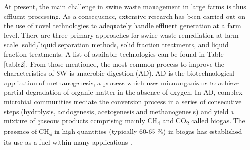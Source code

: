 At present, the main challenge in swine waste management in large farms is thus effluent processing. As a consequence, extensive research has been carried out on the use of novel technologies to adequately handle effluent generation at a farm level. There are three primary approaches for swine waste remediation at farm scale: solid/liquid separation methods, solid fraction treatments, and liquid fraction treatments. A list of available technologies can be found in Table \ref{table2}. From those mentioned, the most common process to improve the characteristics of SW is anaerobic digestion (AD). AD is the biotechnological application of methanogenesis, a process which uses microorganisms to achieve partial degradation of organic matter in the absence of oxygen. In AD, complex microbial communities mediate the conversion process in a series of consecutive steps (hydrolysis, acidogenesis, acetogenesis and methanogenesis) and yield a mixture of gaseous products comprising mainly CH\textsubscript{4} and CO\textsubscript{2} called biogas. The presence of CH\textsubscript{4} in high quantities (typically 60-65 \%) in biogas has established its use as a fuel within many applications \cite{Mata_Alvarez_2014,O_Flaherty_2010}.

